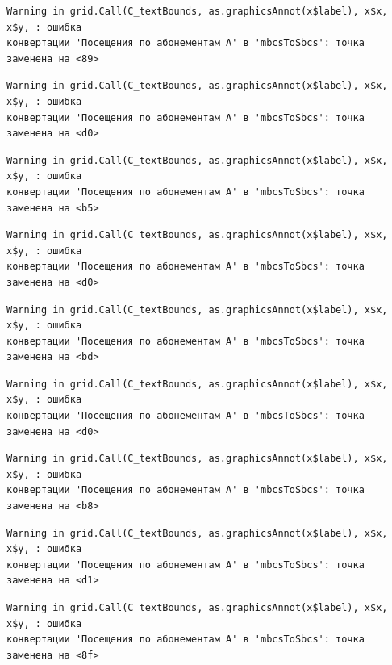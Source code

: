 \documentclass[
  letterpaper,
  DIV=11,
  numbers=noendperiod]{scrreprt}
\begin{document}
\begin{verbatim}
Warning in grid.Call(C_textBounds, as.graphicsAnnot(x$label), x$x, x$y, : ошибка
конвертации 'Посещения по абонементам А' в 'mbcsToSbcs': точка заменена на <89>
\end{verbatim}

\begin{verbatim}
Warning in grid.Call(C_textBounds, as.graphicsAnnot(x$label), x$x, x$y, : ошибка
конвертации 'Посещения по абонементам А' в 'mbcsToSbcs': точка заменена на <d0>
\end{verbatim}

\begin{verbatim}
Warning in grid.Call(C_textBounds, as.graphicsAnnot(x$label), x$x, x$y, : ошибка
конвертации 'Посещения по абонементам А' в 'mbcsToSbcs': точка заменена на <b5>
\end{verbatim}

\begin{verbatim}
Warning in grid.Call(C_textBounds, as.graphicsAnnot(x$label), x$x, x$y, : ошибка
конвертации 'Посещения по абонементам А' в 'mbcsToSbcs': точка заменена на <d0>
\end{verbatim}

\begin{verbatim}
Warning in grid.Call(C_textBounds, as.graphicsAnnot(x$label), x$x, x$y, : ошибка
конвертации 'Посещения по абонементам А' в 'mbcsToSbcs': точка заменена на <bd>
\end{verbatim}

\begin{verbatim}
Warning in grid.Call(C_textBounds, as.graphicsAnnot(x$label), x$x, x$y, : ошибка
конвертации 'Посещения по абонементам А' в 'mbcsToSbcs': точка заменена на <d0>
\end{verbatim}

\begin{verbatim}
Warning in grid.Call(C_textBounds, as.graphicsAnnot(x$label), x$x, x$y, : ошибка
конвертации 'Посещения по абонементам А' в 'mbcsToSbcs': точка заменена на <b8>
\end{verbatim}

\begin{verbatim}
Warning in grid.Call(C_textBounds, as.graphicsAnnot(x$label), x$x, x$y, : ошибка
конвертации 'Посещения по абонементам А' в 'mbcsToSbcs': точка заменена на <d1>
\end{verbatim}

\begin{verbatim}
Warning in grid.Call(C_textBounds, as.graphicsAnnot(x$label), x$x, x$y, : ошибка
конвертации 'Посещения по абонементам А' в 'mbcsToSbcs': точка заменена на <8f>
\end{verbatim}
\end{document}
